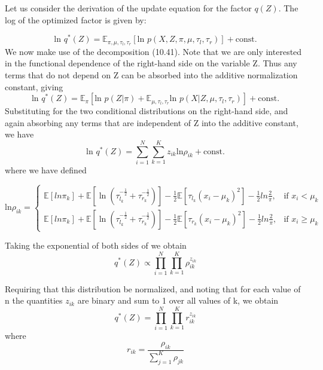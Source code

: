 \documentclass[runningheads]{llncs}
\begin{document}
Let us consider the derivation of the update equation for the factor $q(Z)$. 
The log of the optimized factor is given by: 

\begin{equation}
   \text{ln }q^*(Z) = \mathbb{E}_{\pi,\mu,\tau_l,\tau_r}[\text{ln }p(X,Z,\pi,\mu,\tau_l,\tau_r)] + \text{const.}
\end{equation}
We now make use of the decomposition (10.41). Note that we are only interested in
the functional dependence of the right-hand side on the variable Z. Thus any terms
that do not depend on Z can be absorbed into the additive normalization constant,
giving
\begin{equation}
   \text{ln }q^*(Z) = \mathbb{E}_{\pi}[\text{ln }p(Z|\pi) + \mathbb{E}_{\mu,\tau_l,\tau_r}\text{ln }p(X|Z,\mu,\tau_l,\tau_r)] + \text{const.}
\end{equation}
Substituting for the two conditional distributions on the right-hand side, and again
absorbing any terms that are independent of Z into the additive constant, we have
\begin{equation}
\text{ln }q^*(Z) = \sum_{i=1}^{N}\sum_{k=1}^{K}z_{ik}\text{ln}\rho_{ik} + \text{const.} 
\end{equation}
where we have defined 


\begin{equation}
\text{ln}\rho_{ik} =
\begin{cases} 
\mathbb{E}[ln\pi_k]+\mathbb{E}[\ln(\tau_{l_k}^{-\frac{1}{2}} +\tau_{r_k}^{-\frac{1}{2}})]-\frac{1}{2}\mathbb{E}[\tau_{l_k}(x_i-\mu_k)^2] - \frac{1}{2}ln\frac{2}{\pi}
,& \text{if } x_{i}<\mu_{k}
\\\mathbb{E}[ln\pi_k]+\mathbb{E}[\ln(\tau_{l_k}^{-\frac{1}{2}} + \tau_{r_k}^{-\frac{1}{2}})] - \frac{1}{2}\mathbb{E}[\tau_{r_k}(x_i-\mu_k)^2] - 
\frac{1}{2}ln\frac{2}{\pi},&\text{if } x_{i}\geq\mu_{k}

\end{cases} 
\end{equation}

Taking the exponential of both sides of we obtain
\begin{equation}
   q^*(Z)\propto\prod_{i=1}^{N}\prod_{k=1}^{K}\rho_{ik}^{z_{ik}}
\end{equation}

Requiring that this distribution be normalized, and noting that for each value of n the quantities $z_{ik}$ are binary and sum to 1 over all values of k, we obtain
\begin{equation}
   q^*(Z)=\prod_{i=1}^{N}\prod_{k=1}^{K}r_{ik}^{z_{ik}}
\end{equation}
where
\begin{equation}
   r_{ik}=\frac{\rho_{ik}}{\sum_{j=1}^{K}\rho_{jk}}
\end{equation}
\end{document}
